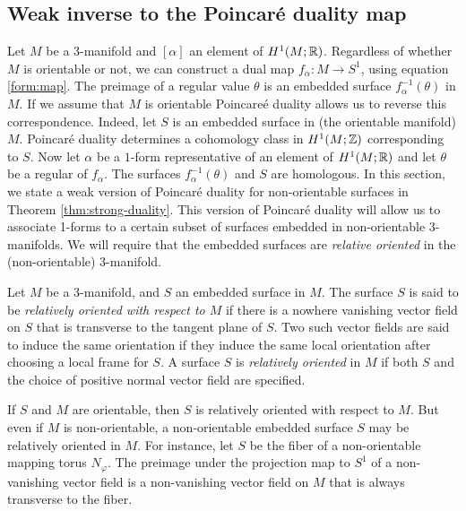 \subsection{Weak inverse to the Poincar\'e duality map}
\label{sec:weak-inverse-poinc}

Let $M$ be a 3-manifold and $[\alpha]$ an element of $H^1(M;\mathbb{R})$.  Regardless of whether $M$ is orientable or not, we can construct a dual map $f_\alpha:M\rightarrow S^1$, using equation \eqref{form:map}.
The preimage of a regular value $\theta$ is an embedded surface $f_{\alpha}^{-1}(\theta)$ in $M$.
If we assume that $M$ is orientable Poincare\'e duality allows us to reverse this correspondence.  Indeed, let $S$ is an embedded surface in (the orientable manifold) $M$.   Poincar\'e duality determines a cohomology class in $H^1(M; \mathbb{Z})$ corresponding to $S$.
Now let $\alpha$ be a $1$-form representative of an element of $H^1(M;\mathbb{R})$ and let $\theta$ be a regular of $f_{\alpha}$.  The surfaces $f_{\alpha}^{-1}(\theta)$ and $S$ are homologous.
In this section, we state a weak version of Poincar\'e duality for non-orientable surfaces in Theorem \ref{thm:strong-duality}.  This version of Poincar\'e duality will allow us to associate 1-forms to a certain subset of surfaces embedded in non-orientable 3-manifolds.
We will require that the embedded surfaces are \emph{relative oriented} in the (non-orientable) 3-manifold.

  Let $M$ be a $3$-manifold, and $S$ an embedded surface in $M$.
  The surface $S$ is said to be \emph{relatively oriented with respect to $M$} if there is a nowhere vanishing vector field on $S$ that is transverse to the tangent plane of $S$.
  Two such vector fields are said to induce the same orientation if they induce the same local orientation after choosing a local frame for $S$.
  A surface $S$ is \emph{relatively oriented} in $M$ if both $S$ and the choice of positive normal vector field are specified.

If $S$ and $M$ are orientable, then $S$ is relatively oriented with respect to $M$.
But even if $M$ is non-orientable, a non-orientable embedded surface $S$ may be relatively oriented in $M$.
For instance, let $S$ be the fiber of a non-orientable mapping torus $N_{\varphi}$.
The preimage under the projection map to $S^1$ of a non-vanishing vector field is a non-vanishing vector field on $M$ that is always transverse to the fiber.

